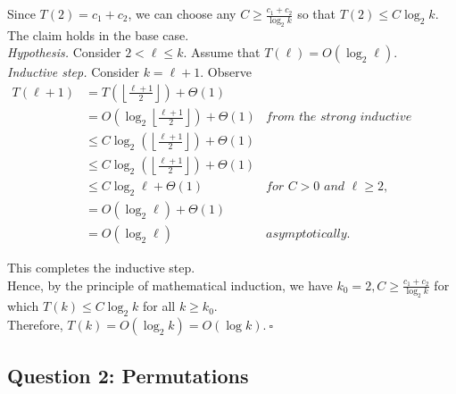 \begin{solution}
\noindent Since $T(2)=c_1+c_2$, we can choose any $C\geq\frac{c_1+c_2}{\log_2{k}}$ so that $T(2)\leq C\log_2{k}$. The claim holds in the base case.\\

\noindent\textit{Hypothesis. }Consider $2<\ell\leq k$. Assume that $T(\ell)=O(\log_2\ell)$.\\

\noindent\textit{Inductive step. }Consider $k=\ell+1$. Observe
\begin{align*}
T(\ell+1)
&=T\left(\left\lfloor\frac{\ell+1}{2}\right\rfloor\right)+\Theta(1)\\
&=O\left(\log_2\left\lfloor\frac{\ell+1}{2}\right\rfloor\right)+\Theta(1)&\textit{from the strong inductive hypothesis,}\\
&\leq C\log_2\left(\left\lfloor\frac{\ell+1}{2}\right\rfloor\right)+\Theta(1)\\
&\leq C\log_2\left(\left\lfloor\frac{\ell+1}{2}\right\rfloor\right)+\Theta(1)\\
&\leq C\log_2\ell+\Theta(1)&\textit{for $C>0$ and $\ell\geq 2,$}\\
&=O(\log_2\ell)+\Theta(1)\\
&=O(\log_2\ell)&\textit{asymptotically.}
\end{align*}

\noindent This completes the inductive step.\\

\noindent Hence, by the principle of mathematical induction, we have $k_0=2,C\geq\frac{c_1+c_2}{\log_2k}$ for which $T(k)\leq C\log_2k$ for all $k\geq k_0$.\\

\noindent Therefore, $T(k)=O(\log_2k)=O(\log k)$.$~\square$
\end{solution}
\subsection*{Question 2: Permutations}

